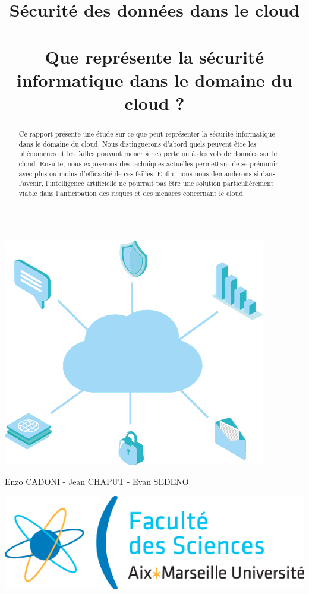 \documentclass[a4paper, 12pt]{article}
\title{\textbf{Sécurité des données dans le cloud}\\~\\Que représente la
sécurité informatique dans le domaine du cloud ?}
\author{}
\date{}
\begin{document}
  \begin{spacing}{1.1}
  \renewcommand{\thepage}{}

  \maketitle
  \rule{\linewidth}{0.4mm}

  \vspace*{2.6cm}
  \begin{center}
    \includegraphics[scale=.5]{img/cloud.png}
  \end{center}

  \vspace*{4.4cm}
  \begin{minipage}{.6\linewidth}
    Enzo CADONI - Jean CHAPUT - Evan SEDENO
  \end{minipage}
  \begin{minipage}{.4\linewidth}
    \includegraphics[scale=.34]{./img/logo.png}
  \end{minipage}

  \newpage
  \tableofcontents
  \newpage

  \renewcommand{\thepage}{\arabic{page}}
  \setcounter{page}{1}
  \begin{abstract}
    Ce rapport présente une étude sur ce que peut représenter la sécurité
    informatique dans le domaine du cloud. Nous distinguerons d'abord quels
    peuvent être les phénomènes et les failles pouvant mener à des perte ou à
    des vols de données sur le cloud. Ensuite, nous exposerons des techniques
    actuelles permettant de se prémunir avec plus ou moins d'efficacité de ces
    failles. Enfin, nous nous demanderons si dans l'avenir, l'intelligence
    artificielle ne pourrait pas être une solution particulièrement viable dans
    l'anticipation des risques et des menaces concernant le cloud.
  \end{abstract}


\end{spacing}
\end{document}
